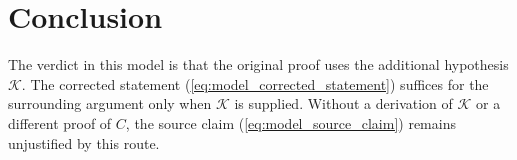 \documentclass{article}
\begin{document}
\section{Conclusion}

The verdict in this model is that the original proof uses the additional
hypothesis $\mathcal K$. The corrected statement
(\ref{eq:model_corrected_statement}) suffices for the surrounding argument only
when $\mathcal K$ is supplied. Without a derivation of $\mathcal K$ or a
different proof of $C$, the source claim
(\ref{eq:model_source_claim}) remains unjustified by this route.



\end{document}
